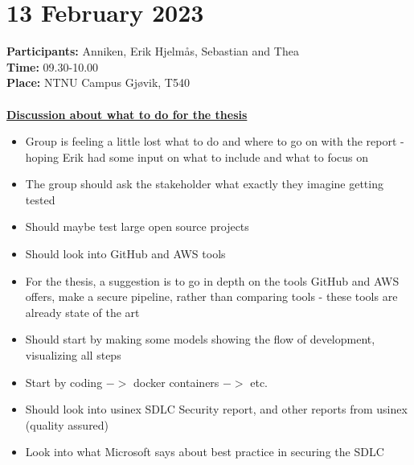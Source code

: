 \section{13 February 2023}
\textbf{Participants:} Anniken, Erik Hjelmås, Sebastian and Thea \\
\textbf{Time:} 09.30-10.00 \\
\textbf{Place:} NTNU Campus Gjøvik, T540
\\~\\

\textbf{\underline{Discussion about what to do for the thesis}}
\begin{itemize}
    \item Group is feeling a little lost what to do and where to go on with the report - hoping Erik had some input on what to include and what to focus on
    \item The group should ask the stakeholder what exactly they imagine getting tested 
    \item Should maybe test large open source projects 
    \item Should look into GitHub and AWS tools 
    \item For the thesis, a suggestion is to go in depth on the tools GitHub and AWS offers, make a secure pipeline, rather than comparing tools - these tools are already state of the art 
    \item Should start by making some models showing the flow of development, visualizing all steps 
    \item Start by coding $->$ docker containers $->$ etc. 
    \item Should look into usinex SDLC Security report, and other reports from usinex (quality assured) 
    \item Look into what Microsoft says about best practice in securing the SDLC 
\end{itemize}